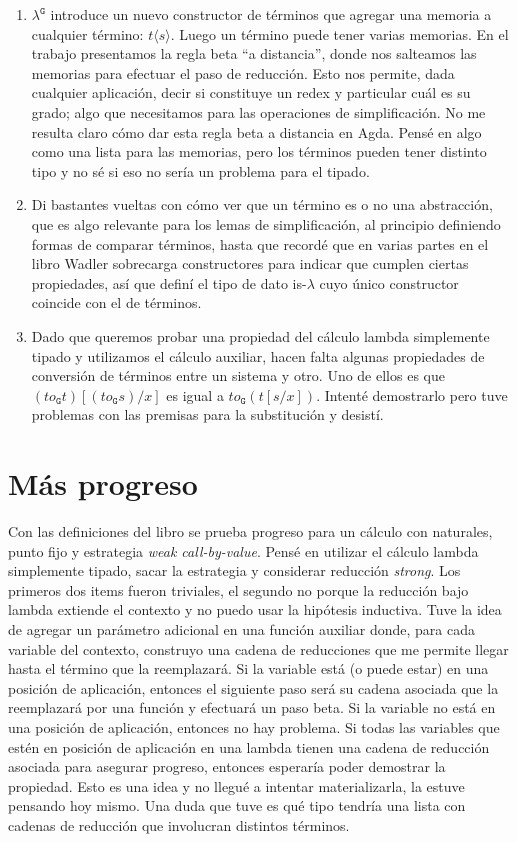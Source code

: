 \documentclass{article}
\newcommand{\lamg}{\ensuremath{\lambda^{\mathtt{G}}}\xspace}
\begin{document}
\begin{enumerate}
\item \lamg introduce un nuevo constructor de términos que agregar una memoria a cualquier término: $t \langle s \rangle$. Luego un término puede tener varias memorias. En el trabajo presentamos la regla beta ``a distancia'', donde nos salteamos las memorias para efectuar el paso de reducción. Esto nos permite, dada cualquier aplicación, decir si constituye un redex y particular cuál es su grado; algo que necesitamos para las operaciones de simplificación. No me resulta claro cómo dar esta regla beta a distancia en Agda. Pensé en algo como una lista para las memorias, pero los términos pueden tener distinto tipo y no sé si eso no sería un problema para el tipado.
\item Di bastantes vueltas con cómo ver que un término es o no una abstracción, que es algo relevante para los lemas de simplificación, al principio definiendo formas de comparar términos, hasta que recordé que en varias partes en el libro Wadler sobrecarga constructores para indicar que cumplen ciertas propiedades, así que definí el tipo de dato is-$\lambda$ cuyo único constructor coincide con el de términos.
\item Dado que queremos probar una propiedad del cálculo lambda simplemente tipado y utilizamos el cálculo auxiliar, hacen falta algunas propiedades de conversión de términos entre un sistema y otro. Uno de ellos es que
  $(to_{\mathtt{G}} t) [ (to_{\mathtt G} s) / x ]$
  es igual a
  $to_{\mathtt G} (t [ s / x ])$.
  Intenté demostrarlo pero tuve problemas con las premisas para la substitución y desistí.
\end{enumerate}

\section{Más progreso}

Con las definiciones del libro se prueba progreso para un cálculo con naturales, punto fijo y estrategia {\em weak call-by-value}. Pensé en utilizar el cálculo lambda simplemente tipado, sacar la estrategia y considerar reducción {\em strong}. Los primeros dos items fueron triviales, el segundo no porque la reducción bajo lambda extiende el contexto y no puedo usar la hipótesis inductiva. Tuve la idea de agregar un parámetro adicional en una función auxiliar donde, para cada variable del contexto, construyo una cadena de reducciones que me permite llegar hasta el término que la reemplazará. Si la variable está (o puede estar) en una posición de aplicación, entonces el siguiente paso será su cadena asociada que la reemplazará por una función y efectuará un paso beta. Si la variable no está en una posición de aplicación, entonces no hay problema. Si todas las variables que estén en posición de aplicación en una lambda tienen una cadena de reducción asociada para asegurar progreso, entonces esperaría poder demostrar la propiedad. Esto es una idea y no llegué a intentar materializarla, la estuve pensando hoy mismo. Una duda que tuve es qué tipo tendría una lista con cadenas de reducción que involucran distintos términos.
\end{document}
